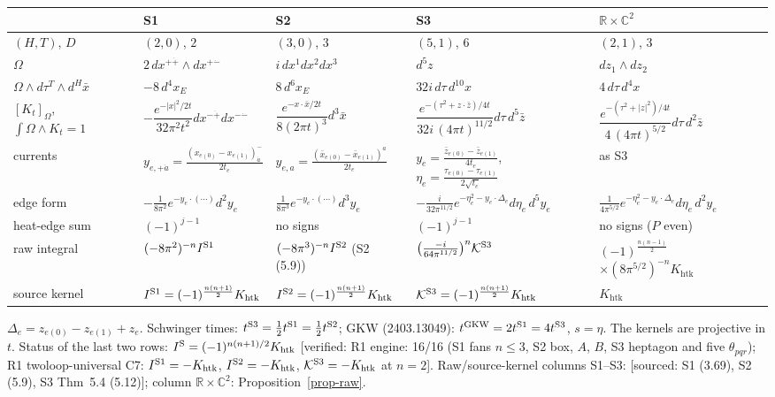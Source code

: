 \documentclass[10pt,a4paper]{article}
\numberwithin{equation}{section}
\theoremstyle{definition}
\theoremstyle{remark}
\newcommand{\zb}{\bar z}
\newcommand{\ver}[1]{\textup{[verified: #1]}}
\newcommand{\src}[1]{\textup{[sourced: #1]}}
\newcommand{\htk}{\mathrm{htk}}
\begin{document}
{\footnotesize
\renewcommand{\arraystretch}{1.3}
\setlength{\tabcolsep}{4pt}
\begin{longtable}{@{}>{\raggedright\arraybackslash}p{1.8cm}>{\raggedright\arraybackslash}p{3.4cm}>{\raggedright\arraybackslash}p{3.2cm}>{\raggedright\arraybackslash}p{3.6cm}>{\raggedright\arraybackslash}p{3.3cm}@{}}
\toprule
 & S1 & S2 & S3 & $\mathbb R\times\mathbb C^2$\\
\midrule\endhead
$(H,T)$, $D$ & $(2,0)$, $2$ & $(3,0)$, $3$ & $(5,1)$, $6$ & $(2,1)$, $3$\\
$\Omega$ & $2\,dx^{+\dot+}\wedge dx^{+\dot-}$ & $i\,dx^1dx^2dx^3$ & $d^5z$ & $dz_1\wedge dz_2$\\
$\Omega\wedge d\tau^T\wedge d^H\bar x$ & $-8\,d^4x_E$ & $8\,d^6x_E$ & $32i\,d\tau\,d^{10}x$ & $4\,d\tau\,d^4x$\\
$[K_t]_\Omega$, $\int\Omega\wedge K_t=1$ & $-\dfrac{e^{-|x|^2/2t}}{32\pi^2t^2}dx^{-\dot+}dx^{-\dot-}$ & $\dfrac{e^{-x\cdot\bar x/2t}}{8(2\pi t)^3}d^3\bar x$ & $\dfrac{e^{-(\tau^2+z\cdot\zb)/4t}}{32i\,(4\pi t)^{11/2}}d\tau\,d^5\zb$ & $\dfrac{e^{-(\tau^2+|z|^2)/4t}}{4\,(4\pi t)^{5/2}}d\tau\,d^2\zb$\\
currents & $y_{e,+\dot a}=\frac{(x_{e(0)}-x_{e(1)})^-_{\dot a}}{2t_e}$ & $y_{e,a}=\frac{(\bar x_{e(0)}-\bar x_{e(1)})^a}{2t_e}$ & $y_e=\frac{\zb_{e(0)}-\zb_{e(1)}}{4t_e}$, $\eta_e=\frac{\tau_{e(0)}-\tau_{e(1)}}{2\sqrt{t_e}}$ & as S3\\
edge form & $-\frac1{8\pi^2}e^{-y_e\cdot(\cdots)}d^2y_e$ & $\frac1{8\pi^3}e^{-y_e\cdot(\cdots)}d^3y_e$ & $-\frac{i}{32\pi^{11/2}}e^{-\eta_e^2-y_e\cdot\Delta_e}$\newline$d\eta_e\,d^5y_e$ & $\frac1{4\pi^{5/2}}e^{-\eta_e^2-y_e\cdot\Delta_e}$\newline$d\eta_e\,d^2y_e$\\
heat-edge sum & $(-1)^{j-1}$ & no signs & $(-1)^{j-1}$ & no signs ($P$ even)\\
raw integral & $(-8\pi^2)^{-n}I^{\rm S1}$ & $(-8\pi^3)^{-n}I^{\rm S2}$ (S2 (5.9)) & $\big(\frac{-i}{64\pi^{11/2}}\big)^n\mathcal K^{\rm S3}$ & $(-1)^{\frac{n(n-1)}2}$\newline$\times(8\pi^{5/2})^{-n}K_\htk$\\
source kernel & $I^{\rm S1}=(-1)^{\frac{n(n+1)}2}K_\htk$ & $I^{\rm S2}=(-1)^{\frac{n(n+1)}2}K_\htk$ & $\mathcal K^{\rm S3}=(-1)^{\frac{n(n+1)}2}K_\htk$ & $K_\htk$\\
\bottomrule
\end{longtable}}

$\Delta_e=z_{e(0)}-z_{e(1)}+z_e$. Schwinger times: $t^{\rm S3}=\tfrac12t^{\rm S1}=\tfrac12t^{\rm S2}$; GKW (2403.13049): $t^{\rm GKW}=2t^{\rm S1}=4t^{\rm S3}$, $s=\eta$. The kernels are projective in $t$.
Status of the last two rows: $I^{\rm S}=(-1)^{n(n+1)/2}K_\htk$ \ver{R1 engine:  16/16 (S1 fans $n\le3$, S2 box, $A$, $B$, S3 heptagon and five $\theta_{pqr}$); R1 twoloop-universal C7: $I^{\rm S1}=-K_\htk$, $I^{\rm S2}=-K_\htk$, $\mathcal K^{\rm S3}=-K_\htk$ at $n=2$}. Raw/source-kernel columns S1--S3: \src{S1 (3.69), S2 (5.9), S3 Thm~5.4 (5.12)}; column $\mathbb R\times\mathbb C^2$: Proposition~\ref{prop-raw}.
\end{document}
